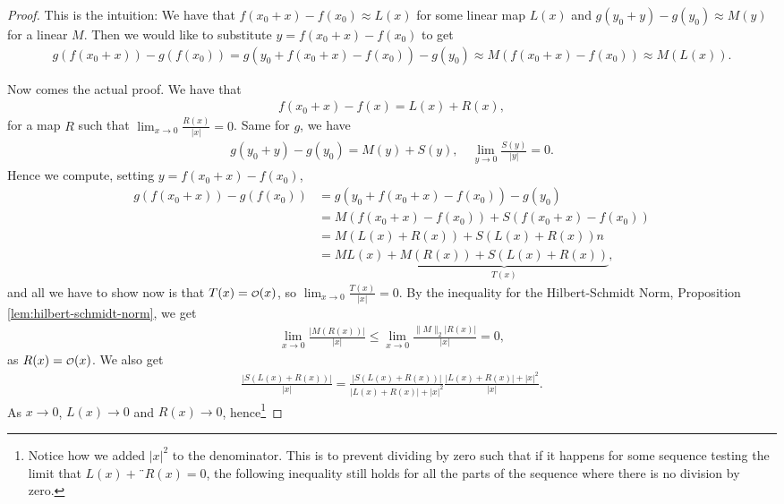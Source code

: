 \begin{proof}
	This is the intuition: We have that $f(x_{0}+x) - f(x_{0}) \approx L(x)$ for some linear map $L(x)$ and $g(y_{0} + y) - g(y_{0}) \approx M(y)$ for a linear $M$. Then we would like to substitute $y = f(x_{0}+x)- f(x_{0})$ to get
	\begin{align*}
		g(f(x_{0}+x)) - g(f(x_{0})) = g(y_{0} + f(x_{0} + x) - f(x_{0})) - g(y_{0}) \approx M(f(x_{0}+x) - f(x_{0})) \approx M(L(x)).
	\end{align*}

	Now comes the actual proof. We have that
	\begin{align*}
		f(x_{0} + x) - f(x) = L(x) + R(x),
	\end{align*}
	for a map $R$ such that $\lim_{x \to 0} \frac{R(x)}{\left| x \right|} = 0$. Same for $g$, we have
	\begin{align*}
		g(y_{0} + y)- g(y_{0}) = M(y) + S(y), \quad \lim_{y \to 0} \frac{S(y)}{\left| y \right|} = 0.
	\end{align*}
	Hence we compute, setting $y = f(x_{0}+x)- f(x_{0})$,
	\begin{align*}
		g(f(x_{0}+x)) - g(f(x_{0})) & = g(y_{0} + f(x_{0} + x) - f(x_{0})) - g(y_{0})
		\\ &= M(f(x_{0}+x)-f(x_{0})) + S(f(x_{0} + x) - f(x_{0}))
		\\ &= M(L(x)+R(x)) + S(L(x) + R(x)) n
		\\ &= ML(x)+\underbrace{ M(R(x)) + S(L(x) + R(x))}_{T(x)},
	\end{align*}
	and all we have to show now is that $T(x) = \smalO(x)$, so $\lim_{x \to 0} \frac{T(x)}{\left| x \right|} = 0$. By the inequality for the Hilbert-Schmidt Norm, Proposition \ref{lem:hilbert-schmidt-norm}, we get
	\begin{align*}
		\lim_{x \to 0}\frac{\left| M(R(x)) \right|}{\left| x \right|} \leq \lim_{x \to 0} \frac{\lVert M \rVert_{2} \left| R(x) \right|}{\left| x \right|} = 0,
	\end{align*}
	as $R(x) = \smalO(x)$. We also get
	\begin{align*}
		\frac{|S(L(x) + R(x))|}{\left| x \right|} = \frac{\left| S(L(x) + R(x)) \right|}{\left| L(x)+R(x) \right| + \left| x \right|^{2}} \frac{\left| L(x)+R(x) \right|+\left| x\right|^{2}}{\left| x \right|}.
	\end{align*}
	As $x \to 0$, $L(x) \to 0$ and $R(x) \to 0$, hence\footnote{Notice how we added $\left| x \right|^{2}$ to the denominator. This is to prevent dividing by zero such that if it happens for some sequence testing the limit that $L(x) + ¨R(x)=0$, the following inequality still holds for all the parts of the sequence where there is no division by zero.}

\end{proof}
